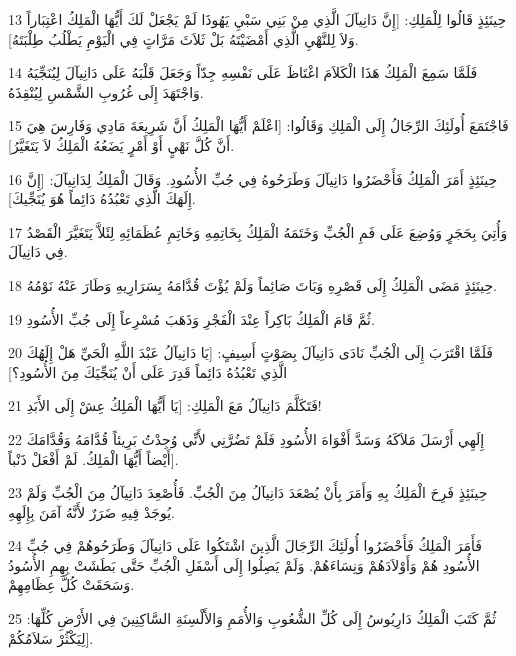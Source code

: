 \par 13 حِينَئِذٍ قَالُوا لِلْمَلِكِ: [إِنَّ دَانِيآلَ الَّذِي مِنْ بَنِي سَبْيِ يَهُوذَا لَمْ يَجْعَلْ لَكَ أَيُّهَا الْمَلِكُ اعْتِبَاراً وَلاَ لِلنَّهْيِ الَّذِي أَمْضَيْتَهُ بَلْ ثَلاَثَ مَرَّاتٍ فِي الْيَوْمِ يَطْلُبُ طِلْبَتَهُ].
\par 14 فَلَمَّا سَمِعَ الْمَلِكُ هَذَا الْكَلاَمَ اغْتَاظَ عَلَى نَفْسِهِ جِدّاً وَجَعَلَ قَلْبَهُ عَلَى دَانِيآلَ لِيُنَجِّيَهُ وَاجْتَهَدَ إِلَى غُرُوبِ الشَّمْسِ لِيُنْقِذَهُ.
\par 15 فَاجْتَمَعَ أُولَئِكَ الرِّجَالُ إِلَى الْمَلِكِ وَقَالُوا: [اعْلَمْ أَيُّهَا الْمَلِكُ أَنَّ شَرِيعَةَ مَادِي وَفَارِسَ هِيَ أَنَّ كُلَّ نَهْيٍ أَوْ أَمْرٍ يَضَعُهُ الْمَلِكُ لاَ يَتَغَيَّرُ].
\par 16 حِينَئِذٍ أَمَرَ الْمَلِكُ فَأَحْضَرُوا دَانِيآلَ وَطَرَحُوهُ فِي جُبِّ الأُسُودِ. وَقَالَ الْمَلِكُ لِدَانِيآلَ: [إِنَّ إِلَهَكَ الَّذِي تَعْبُدُهُ دَائِماً هُوَ يُنَجِّيكَ].
\par 17 وَأُتِيَ بِحَجَرٍ وَوُضِعَ عَلَى فَمِ الْجُبِّ وَخَتَمَهُ الْمَلِكُ بِخَاتِمِهِ وَخَاتِمِ عُظَمَائِهِ لِئَلاَّ يَتَغَيَّرَ الْقَصْدُ فِي دَانِيآلَ.
\par 18 حِينَئِذٍ مَضَى الْمَلِكُ إِلَى قَصْرِهِ وَبَاتَ صَائِماً وَلَمْ يُؤْتَ قُدَّامَهُ بِسَرَارِيهِ وَطَارَ عَنْهُ نَوْمُهُ.
\par 19 ثُمَّ قَامَ الْمَلِكُ بَاكِراً عِنْدَ الْفَجْرِ وَذَهَبَ مُسْرِعاً إِلَى جُبِّ الأُسُودِ.
\par 20 فَلَمَّا اقْتَرَبَ إِلَى الْجُبِّ نَادَى دَانِيآلَ بِصَوْتٍ أَسِيفٍ: [يَا دَانِيآلُ عَبْدَ اللَّهِ الْحَيِّ هَلْ إِلَهُكَ الَّذِي تَعْبُدُهُ دَائِماً قَدِرَ عَلَى أَنْ يُنَجِّيَكَ مِنَ الأُسُودِ؟]
\par 21 فَتَكَلَّمَ دَانِيآلُ مَعَ الْمَلِكِ: [يَا أَيُّهَا الْمَلِكُ عِشْ إِلَى الأَبَدِ!
\par 22 إِلَهِي أَرْسَلَ مَلاَكَهُ وَسَدَّ أَفْوَاهَ الأُسُودِ فَلَمْ تَضُرَّنِي لأَنِّي وُجِدْتُ بَرِيئاً قُدَّامَهُ وَقُدَّامَكَ أَيْضاً أَيُّهَا الْمَلِكُ. لَمْ أَفْعَلْ ذَنْباً].
\par 23 حِينَئِذٍ فَرِحَ الْمَلِكُ بِهِ وَأَمَرَ بِأَنْ يُصْعَدَ دَانِيآلُ مِنَ الْجُبِّ. فَأُصْعِدَ دَانِيآلُ مِنَ الْجُبِّ وَلَمْ يُوجَدْ فِيهِ ضَرَرٌ لأَنَّهُ آمَنَ بِإِلَهِهِ.
\par 24 فَأَمَرَ الْمَلِكُ فَأَحْضَرُوا أُولَئِكَ الرِّجَالَ الَّذِينَ اشْتَكُوا عَلَى دَانِيآلَ وَطَرَحُوهُمْ فِي جُبِّ الأُسُودِ هُمْ وَأَوْلاَدَهُمْ وَنِسَاءَهُمْ. وَلَمْ يَصِلُوا إِلَى أَسْفَلِ الْجُبِّ حَتَّى بَطَشَتْ بِهِمِ الأُسُودُ وَسَحَقَتْ كُلَّ عِظَامِهِمْ.
\par 25 ثُمَّ كَتَبَ الْمَلِكُ دَارِيُوسُ إِلَى كُلِّ الشُّعُوبِ وَالأُمَمِ وَالأَلْسِنَةِ السَّاكِنِينَ فِي الأَرْضِ كُلِّهَا: [لِيَكْثُرْ سَلاَمُكُمْ.
